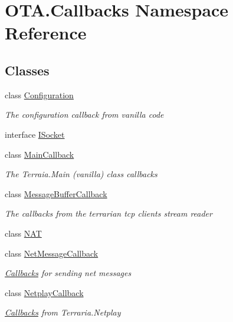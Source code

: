 \hypertarget{namespaceOTA_1_1Callbacks}{}\section{O\+T\+A.\+Callbacks Namespace Reference}
\label{namespaceOTA_1_1Callbacks}
\subsection*{Classes}
\begin{DoxyCompactItemize}
\item 
class \hyperlink{classOTA_1_1Callbacks_1_1Configuration}{Configuration}
\begin{DoxyCompactList}\small\item\em The configuration callback from vanilla code \end{DoxyCompactList}\item 
interface \hyperlink{interfaceOTA_1_1Callbacks_1_1ISocket}{I\+Socket}
\item 
class \hyperlink{classOTA_1_1Callbacks_1_1MainCallback}{Main\+Callback}
\begin{DoxyCompactList}\small\item\em The Terraia.\+Main (vanilla) class callbacks \end{DoxyCompactList}\item 
class \hyperlink{classOTA_1_1Callbacks_1_1MessageBufferCallback}{Message\+Buffer\+Callback}
\begin{DoxyCompactList}\small\item\em The callbacks from the terrarian tcp clients\textquotesingle{} stream reader \end{DoxyCompactList}\item 
class \hyperlink{classOTA_1_1Callbacks_1_1NAT}{N\+A\+T}
\item 
class \hyperlink{classOTA_1_1Callbacks_1_1NetMessageCallback}{Net\+Message\+Callback}
\begin{DoxyCompactList}\small\item\em \hyperlink{namespaceOTA_1_1Callbacks}{Callbacks} for sending net messages \end{DoxyCompactList}\item 
class \hyperlink{classOTA_1_1Callbacks_1_1NetplayCallback}{Netplay\+Callback}
\begin{DoxyCompactList}\small\item\em \hyperlink{namespaceOTA_1_1Callbacks}{Callbacks} from Terraria.\+Netplay \end{DoxyCompactList}\item 

\end{DoxyCompactItemize}
